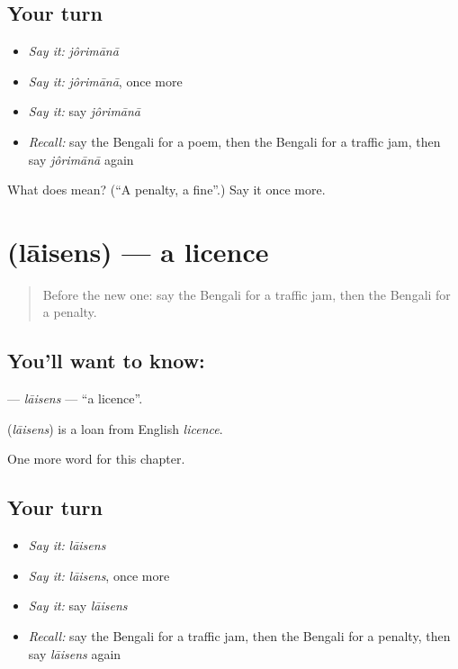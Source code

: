 \subsection*{Your turn}
\begin{itemize}
\raggedright
  \item \emph{Say it:} \emph{jôrimānā}
  \item \emph{Say it:} \emph{jôrimānā}, once more
  \item \emph{Say it:} say \emph{jôrimānā}
  \item \emph{Recall:} say the Bengali for a poem, then the Bengali for a traffic jam, then say \emph{jôrimānā} again
\end{itemize}

\begin{tcolorbox}[breakable,colback=teal!4,colframe=teal!35!black,title={Before you move on}]
What does  mean? (\textquotedblleft{}A penalty, a fine\textquotedblright{}.) Say it once more.
\end{tcolorbox}
\section[\texorpdfstring{\bn{লাইসেন্স} (lāisens)}{লাইসেন্স (lāisens)}]{ (lāisens) — a licence}

\label{lesson:BN-C226-laisens}



\begin{quote}
Before the new one: say the Bengali for a traffic jam, then the Bengali for a penalty.
\end{quote}

\subsection*{You'll want to know: }
\textbf{} — \emph{lāisens} — \textquotedblleft{}a licence\textquotedblright{}.

\begin{cousinweb}
\textbf{} (\emph{lāisens}) is a loan from English \emph{licence}.
\end{cousinweb}

\begin{grammarlens}[title={What you've built}]
One more word for this chapter.
\end{grammarlens}

\subsection*{Your turn}
\begin{itemize}
\raggedright
  \item \emph{Say it:} \emph{lāisens}
  \item \emph{Say it:} \emph{lāisens}, once more
  \item \emph{Say it:} say \emph{lāisens}
  \item \emph{Recall:} say the Bengali for a traffic jam, then the Bengali for a penalty, then say \emph{lāisens} again
\end{itemize}

